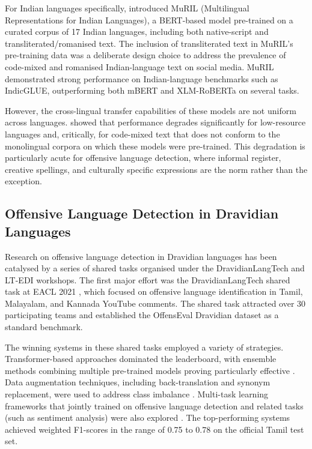 \documentclass[12pt, a4paper]{article}
\begin{document}
For Indian languages specifically, \citet{khanuja2021muril} introduced MuRIL (Multilingual Representations for Indian Languages), a BERT-based model pre-trained on a curated corpus of 17 Indian languages, including both native-script and transliterated/romanised text. The inclusion of transliterated text in MuRIL's pre-training data was a deliberate design choice to address the prevalence of code-mixed and romanised Indian-language text on social media. MuRIL demonstrated strong performance on Indian-language benchmarks such as IndicGLUE, outperforming both mBERT and XLM-RoBERTa on several tasks.

However, the cross-lingual transfer capabilities of these models are not uniform across languages. \citet{pamungkas2019cross} showed that performance degrades significantly for low-resource languages and, critically, for code-mixed text that does not conform to the monolingual corpora on which these models were pre-trained. This degradation is particularly acute for offensive language detection, where informal register, creative spellings, and culturally specific expressions are the norm rather than the exception.

\subsection{Offensive Language Detection in Dravidian Languages}

Research on offensive language detection in Dravidian languages has been catalysed by a series of shared tasks organised under the DravidianLangTech and LT-EDI workshops. The first major effort was the DravidianLangTech shared task at EACL 2021 \citep{chakravarthi2021dravidian}, which focused on offensive language identification in Tamil, Malayalam, and Kannada YouTube comments. The shared task attracted over 30 participating teams and established the OffensEval Dravidian dataset as a standard benchmark.

The winning systems in these shared tasks employed a variety of strategies. Transformer-based approaches dominated the leaderboard, with ensemble methods combining multiple pre-trained models proving particularly effective \citep{dowlagar2021cfilt}. Data augmentation techniques, including back-translation and synonym replacement, were used to address class imbalance \citep{risch2020data}. Multi-task learning frameworks that jointly trained on offensive language detection and related tasks (such as sentiment analysis) were also explored \citep{rajamanickam2020joint}. The top-performing systems achieved weighted F1-scores in the range of 0.75 to 0.78 on the official Tamil test set.
\end{document}

